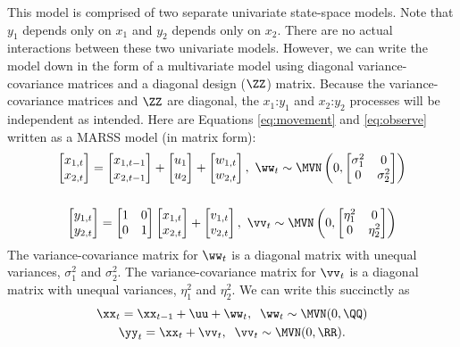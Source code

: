 This model is  comprised of two separate univariate state-space models.  Note that $y_1$ depends only on $x_1$ and $y_2$ depends only on $x_2$.  There are no actual interactions between these two univariate models.  However, we can write the model down in the form of a multivariate model using diagonal variance-covariance matrices and a diagonal design ($\ZZ$) matrix.  Because the variance-covariance matrices and $\ZZ$ are diagonal, the $x_1$:$y_1$ and $x_2$:$y_2$ processes will be independent as intended.  Here are Equations \ref{eq:movement} and \ref{eq:observe} written as a MARSS model (in matrix form):
\begin{gather}
\begin{bmatrix}x_{1,t}\\x_{2,t}\end{bmatrix}
= \begin{bmatrix}x_{1,t-1}\\x_{2,t-1}\end{bmatrix}
+ \begin{bmatrix}u_1\\u_2\end{bmatrix}
+ \begin{bmatrix}w_{1,t}\\w_{2,t}\end{bmatrix},
 \textrm{ } \ww_t \sim \MVN\begin{pmatrix}0,\begin{bmatrix}\sigma^2_1&0\\0&\sigma^2_2\end{bmatrix} \end{pmatrix}  \label{eq:mssmlong.a} \\
\nonumber \\
\begin{bmatrix}y_{1,t}\\y_{2,t}\end{bmatrix}
= \begin{bmatrix}1&0\\0&1\end{bmatrix}
\begin{bmatrix}x_{1,t}\\x_{2,t}\end{bmatrix}
+ \begin{bmatrix}v_{1,t}\\ v_{2,t}\end{bmatrix},
 \textrm{ } \vv_t \sim \MVN\begin{pmatrix}0,\begin{bmatrix}\eta^2_1&0\\0&\eta^2_2\end{bmatrix} \end{pmatrix}  \label{eq:mssmlong.b}
\end{gather}
The variance-covariance matrix for $\ww_t$ is a diagonal matrix with unequal variances, $\sigma^2_1$ and $\sigma^2_2$. The variance-covariance matrix for $\vv_t$ is a diagonal matrix with unequal variances,  $\eta^2_1$ and $\eta^2_2$. We can write this succinctly as
\begin{gather}
\xx_t = \xx_{t-1} + \uu + \ww_t, \;\; \ww_t \sim \MVN(0,\QQ) \\
\yy_t = \xx_{t} + \vv_t, \;\; \vv_t \sim \MVN(0,\RR). 
\label{eq:mssm}
\end{gather}

